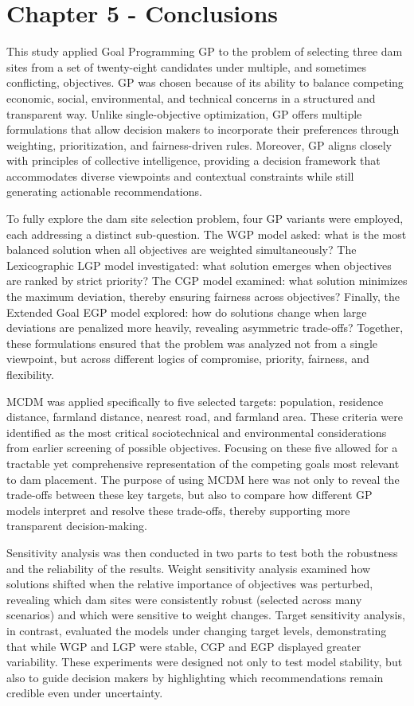 \section{Chapter 5 - Conclusions}\label{sec:conclusions}
This study applied Goal Programming \gls{GP} to the problem of selecting three dam sites from a set of twenty-eight candidates under multiple, and sometimes conflicting, objectives. \gls{GP} was chosen because of its ability to balance competing economic, social, environmental, and technical concerns in a structured and transparent way. Unlike single-objective optimization, \gls{GP} offers multiple formulations that allow decision makers to incorporate their preferences through weighting, prioritization, and fairness-driven rules. Moreover, \gls{GP} aligns closely with principles of collective intelligence, providing a decision framework that accommodates diverse viewpoints and contextual constraints while still generating actionable recommendations.  

To fully explore the dam site selection problem, four \gls{GP} variants were employed, each addressing a distinct sub-question. The \gls{WGP} model asked: what is the most balanced solution when all objectives are weighted simultaneously? The Lexicographic \gls{LGP} model investigated: what solution emerges when objectives are ranked by strict priority? The CGP model examined: what solution minimizes the maximum deviation, thereby ensuring fairness across objectives? Finally, the Extended Goal \gls{EGP} model explored: how do solutions change when large deviations are penalized more heavily, revealing asymmetric trade-offs? Together, these formulations ensured that the problem was analyzed not from a single viewpoint, but across different logics of compromise, priority, fairness, and flexibility.

\gls{MCDM} was applied specifically to five selected targets: population, residence distance, farmland distance, nearest road, and farmland area. These criteria were identified as the most critical sociotechnical and environmental considerations from earlier screening of possible objectives. Focusing on these five allowed for a tractable yet comprehensive representation of the competing goals most relevant to dam placement. The purpose of using MCDM here was not only to reveal the trade-offs between these key targets, but also to compare how different \gls{GP} models interpret and resolve these trade-offs, thereby supporting more transparent decision-making.

Sensitivity analysis was then conducted in two parts to test both the robustness and the reliability of the results. Weight sensitivity analysis examined how solutions shifted when the relative importance of objectives was perturbed, revealing which dam sites were consistently robust (selected across many scenarios) and which were sensitive to weight changes. Target sensitivity analysis, in contrast, evaluated the models under changing target levels, demonstrating that while WGP and LGP were stable, CGP and EGP displayed greater variability. These experiments were designed not only to test model stability, but also to guide decision makers by highlighting which recommendations remain credible even under uncertainty.

